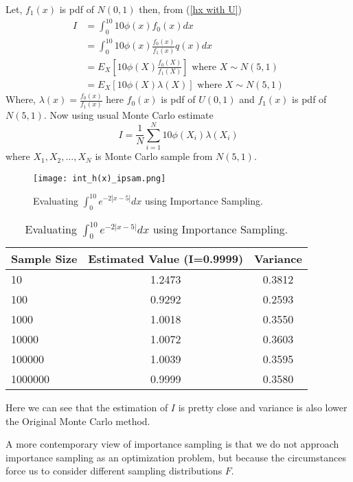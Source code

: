 \begin{example}
	Let, $f_1(x)$ is pdf of $N(0,1)$ then, from (\ref{hx with U})
	\begin{align*}
		I & = \int_{0}^{10} 10\phi(x) f_0(x) dx                                            \\
		  & = \int_{0}^{10} 10 \phi(x) \frac{f_0(x)}{f_1(x)} q(x)dx                          \\
		  & = E_X\left[ 10 \phi(X) \frac{f_0(X)}{f_1(X)} \right] \text{ where } X\sim N(5,1) \\
		  & = E_X\left[ 10 \phi(X) \lambda(X) \right]\text{ where } X\sim N(5,1)
	\end{align*}
	Where, $\lambda(x) = \frac{f_0(x)}{f_1(x)}$ here $f_0(x)$ is pdf of $U(0,1)$ and $f_1(x)$ is pdf of $N(5,1)$. Now using usual Monte Carlo estimate
	\[
		I = \frac{1}{N} \sum_{i = 1}^{N} 10 \phi(X_i) \lambda(X_i)
	\]
	where $X_1, X_2,\ldots,X_N$ is Monte Carlo sample from $N(5,1)$.
	\begin{figure}[H]
		\centering
		\texttt{[image: int\_h(x)\_ipsam.png]}
		\caption{Evaluating $\int_{0}^{10} e^{-2 |x-5|} dx$ using Importance Sampling.}
		\label{fig:impotrancesampling1}
	\end{figure}
	\begin{table}[h]
		\centering
		\begin{tabular}{l c c}
			\hline
			Sample Size & Estimated Value (I=0.9999) & Variance \\
			\hline
			10          & 1.2473                     & 0.3812   \\
			100         & 0.9292                     & 0.2593   \\
			1000        & 1.0018                     & 0.3550   \\
			10000       & 1.0072                     & 0.3603   \\
			100000      & 1.0039                     & 0.3595   \\
			1000000     & 0.9999                     & 0.3580   \\
			\hline
		\end{tabular}
		\caption{Evaluating $\int_{0}^{10} e^{-2 |x-5|} dx$ using Importance Sampling.}
		\label{tab:mytable}
	\end{table}
	Here we can see that the estimation of $I$ is pretty close and variance is also
	lower the Original Monte Carlo method.
\end{example}

A more contemporary view of importance sampling is that we do not approach
importance sampling as an optimization problem, but because the circumstances
force us to consider different sampling distributions $F$.

